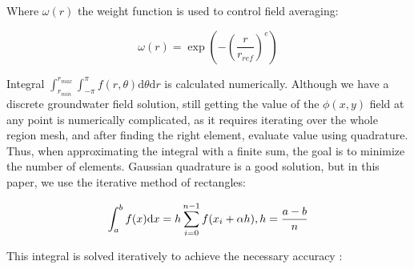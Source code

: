 \documentclass[]{pracamgr}
\begin{document}
      Where $\omega(r)$ the weight function is used to control field averaging:

      \begin{equation}
        \label{integration_weight}
        \omega(r) = \exp(-{(\frac{r}{r_{ref}})}^e)
      \end{equation}

      Integral $\int^{r_{max}}_{r_{min}} \int^{\pi}_{-\pi} f(r, \theta) \textrm{d} \theta \textrm{d} r$ is calculated numerically. Although we have a discrete groundwater field solution, still getting the value of the $\phi(x, y)$ field at any point is numerically complicated, as it requires iterating over the whole region mesh, and after finding the right element, evaluate value using quadrature. Thus, when approximating the integral with a finite sum, the goal is to minimize the number of elements. Gaussian quadrature is a good solution, but in this paper, we use the iterative method of rectangles:

      \begin{equation}
        \label{numerical_integral}
        \int^{b}_{a} f(x) \textrm{d} x = h \sum_{i = 0}^{n - 1} f(x_i + \alpha h),    \\
        h = \frac{a - b}{n}  
      \end{equation}

      This integral is solved iteratively to achieve the necessary accuracy \cite{Press2007}:
\end{document}
